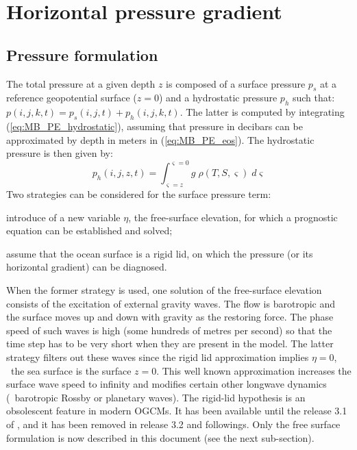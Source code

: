\documentclass[../main/NEMO_manual]{subfiles}
\begin{document}
\section{Horizontal pressure gradient}
\label{sec:MB_hor_pg}

\subsection{Pressure formulation}
\label{subsec:MB_p_formulation}

The total pressure at a given depth $z$ is composed of a surface pressure $p_s$ at
a reference geopotential surface ($z = 0$) and a hydrostatic pressure $p_h$ such that:
$p(i,j,k,t) = p_s(i,j,t) + p_h(i,j,k,t)$.
The latter is computed by integrating (\autoref{eq:MB_PE_hydrostatic}),
assuming that pressure in decibars can be approximated by depth in meters in (\autoref{eq:MB_PE_eos}).
The hydrostatic pressure is then given by:
\[
  p_h (i,j,z,t) = \int_{\varsigma = z}^{\varsigma = 0} g \; \rho (T,S,\varsigma) \; d \varsigma
\]
Two strategies can be considered for the surface pressure term:
\begin{enumerate*}[label=(\textit{\alph*})]
\item introduce of a new variable $\eta$, the free-surface elevation,
for which a prognostic equation can be established and solved;
\item assume that the ocean surface is a rigid lid,
on which the pressure (or its horizontal gradient) can be diagnosed.
\end{enumerate*}
When the former strategy is used, one solution of the free-surface elevation consists of
the excitation of external gravity waves.
The flow is barotropic and the surface moves up and down with gravity as the restoring force.
The phase speed of such waves is high (some hundreds of metres per second) so that
the time step has to be very short when they are present in the model.
The latter strategy filters out these waves since the rigid lid approximation implies $\eta = 0$,
\ie\ the sea surface is the surface $z = 0$.
This well known approximation increases the surface wave speed to infinity and
modifies certain other longwave dynamics (\eg\ barotropic Rossby or planetary waves).
The rigid-lid hypothesis is an obsolescent feature in modern OGCMs.
It has been available until the release 3.1 of \NEMO,
and it has been removed in release 3.2 and followings.
Only the free surface formulation is now described in this document (see the next sub-section).
\end{document}
